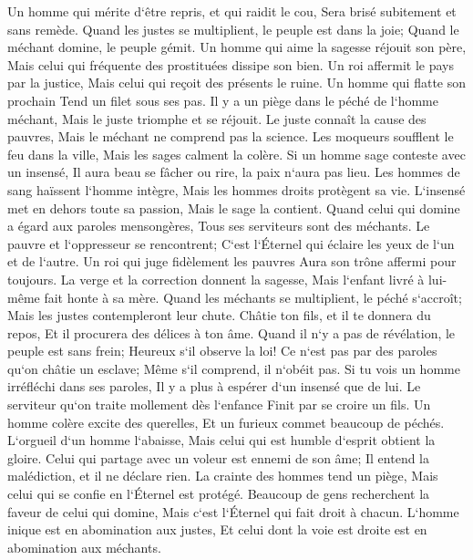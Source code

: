 \verse Un homme qui mérite d`être repris, et qui raidit le cou, Sera brisé subitement et sans remède. 
\verse Quand les justes se multiplient, le peuple est dans la joie; Quand le méchant domine, le peuple gémit. 
\verse Un homme qui aime la sagesse réjouit son père, Mais celui qui fréquente des prostituées dissipe son bien. 
\verse Un roi affermit le pays par la justice, Mais celui qui reçoit des présents le ruine. 
\verse Un homme qui flatte son prochain Tend un filet sous ses pas. 
\verse Il y a un piège dans le péché de l`homme méchant, Mais le juste triomphe et se réjouit. 
\verse Le juste connaît la cause des pauvres, Mais le méchant ne comprend pas la science. 
\verse Les moqueurs soufflent le feu dans la ville, Mais les sages calment la colère. 
\verse Si un homme sage conteste avec un insensé, Il aura beau se fâcher ou rire, la paix n`aura pas lieu. 
\verse Les hommes de sang haïssent l`homme intègre, Mais les hommes droits protègent sa vie. 
\verse L`insensé met en dehors toute sa passion, Mais le sage la contient. 
\verse Quand celui qui domine a égard aux paroles mensongères, Tous ses serviteurs sont des méchants. 
\verse Le pauvre et l`oppresseur se rencontrent; C`est l`Éternel qui éclaire les yeux de l`un et de l`autre. 
\verse Un roi qui juge fidèlement les pauvres Aura son trône affermi pour toujours. 
\verse La verge et la correction donnent la sagesse, Mais l`enfant livré à lui-même fait honte à sa mère. 
\verse Quand les méchants se multiplient, le péché s`accroît; Mais les justes contempleront leur chute. 
\verse Châtie ton fils, et il te donnera du repos, Et il procurera des délices à ton âme. 
\verse Quand il n`y a pas de révélation, le peuple est sans frein; Heureux s`il observe la loi! 
\verse Ce n`est pas par des paroles qu`on châtie un esclave; Même s`il comprend, il n`obéit pas. 
\verse Si tu vois un homme irréfléchi dans ses paroles, Il y a plus à espérer d`un insensé que de lui. 
\verse Le serviteur qu`on traite mollement dès l`enfance Finit par se croire un fils. 
\verse Un homme colère excite des querelles, Et un furieux commet beaucoup de péchés. 
\verse L`orgueil d`un homme l`abaisse, Mais celui qui est humble d`esprit obtient la gloire. 
\verse Celui qui partage avec un voleur est ennemi de son âme; Il entend la malédiction, et il ne déclare rien. 
\verse La crainte des hommes tend un piège, Mais celui qui se confie en l`Éternel est protégé. 
\verse Beaucoup de gens recherchent la faveur de celui qui domine, Mais c`est l`Éternel qui fait droit à chacun. 
\verse L`homme inique est en abomination aux justes, Et celui dont la voie est droite est en abomination aux méchants. 

